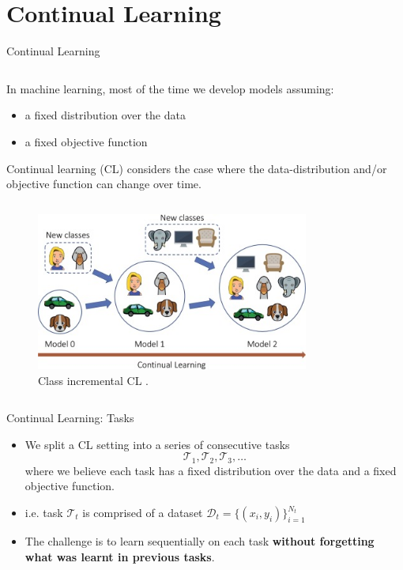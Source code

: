 \documentclass[12pt,aspectratio=169, handout]{beamer}
\let\olditem\item
\renewcommand\item{\olditem\justifying}
\begin{document}
\section{Continual Learning}
\begin{frame}{Continual Learning}
    \begin{column}{0.45\textwidth}
        In machine learning, most of the time we develop models assuming:
        \pause
        \begin{itemize}
            \item a fixed distribution over the data
            \pause
            \item a fixed objective function
        \end{itemize}
        \pause
        Continual learning (CL) considers the case where the data-distribution and/or objective function can change over time.
    \end{column}
    \begin{column}{0.05\textwidth}
    \hspace*{1em}
    \end{column}
    \begin{column}{0.5\textwidth}
        \pause
        \begin{figure}
            \begin{center}
                \includegraphics[width=0.8\textwidth]{"images/class_incremental_CL.jpg"}
                \caption{Class incremental CL \parencite{michieli_chapter_2022}.}
            \end{center}
    	\end{figure}
    \end{column}
\end{frame}

\begin{frame}{Continual Learning: Tasks}
\begin{itemize}
    \item We split a CL setting into a series of consecutive tasks $$\mathcal{T}_1,\mathcal{T}_2,\mathcal{T}_3,\ldots$$ where we believe each task has a fixed distribution over the data and a fixed objective function.

    \pause 
    \item i.e. task $\mathcal{T}_t$ is comprised of a dataset $\mathcal{D}_t = \{(x_i,y_i)\}_{i=1}^{N_t}$
    \pause
    \item The challenge is to learn sequentially on each task \textbf{without forgetting what was learnt in previous tasks}.
\end{itemize}
\end{frame}
\end{document}
